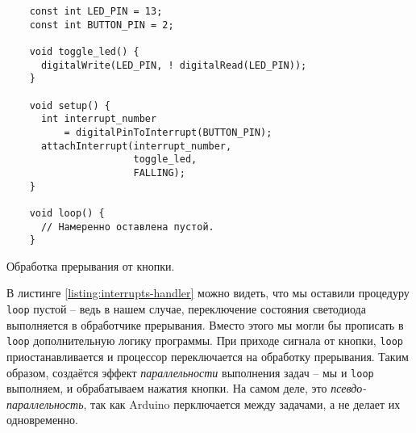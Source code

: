 \documentclass[../sparc.tex]{subfiles}
\begin{document}
\begin{listing}[H]
  \begin{verbatim}
    const int LED_PIN = 13;
    const int BUTTON_PIN = 2;

    void toggle_led() {
      digitalWrite(LED_PIN, ! digitalRead(LED_PIN));
    }

    void setup() {
      int interrupt_number
          = digitalPinToInterrupt(BUTTON_PIN);
      attachInterrupt(interrupt_number,
                      toggle_led,
                      FALLING);
    }

    void loop() {
      // Намеренно оставлена пустой.
    }
  \end{verbatim}
  \caption{Обработка прерывания от кнопки.}
  \label{listing:interrupts-handler}
\end{listing}

В листинге \ref{listing:interrupts-handler} можно видеть, что мы оставили
процедуру \texttt{loop} пустой -- ведь в нашем случае, переключение состояния
светодиода выполняется в обработчике прерывания.  Вместо этого мы могли бы
прописать в \texttt{loop} дополнительную логику программы.  При приходе сигнала
от кнопки, \texttt{loop} приостанавливается и процессор переключается на
обработку прерывания.  Таким образом, создаётся эффект \emph{параллельности}
выполнения задач -- мы и \texttt{loop} выполняем, и обрабатываем нажатия кнопки.
На самом деле, это \emph{псевдо-параллельность}, так как Arduino перключается
между задачами, а не делает их одновременно.
\end{document}
